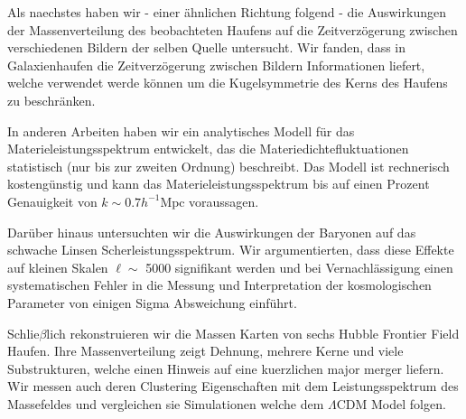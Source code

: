 Als naechstes haben wir - einer {\"a}hnlichen Richtung folgend - die
Auswirkungen der Massenverteilung des beobachteten Haufens auf die
Zeitverzögerung zwischen verschiedenen Bildern der selben Quelle untersucht.
Wir fanden, dass in Galaxienhaufen die Zeitverz{\"o}gerung zwischen Bildern
Informationen liefert, welche verwendet werde k{\"o}nnen um die Kugelsymmetrie
des Kerns des Haufens zu beschr{\"a}nken.

In anderen Arbeiten haben wir ein analytisches Modell f{\"u}r das
Materieleistungsspektrum entwickelt, das die Materiedichtefluktuationen
statistisch (nur bis zur zweiten Ordnung) beschreibt.
Das Modell ist  rechnerisch kosteng{\"u}nstig und kann das
Materieleistungsspektrum bis auf einen Prozent Genauigkeit von
$k \sim 0.7 h^{- 1} \mathrm{Mpc}$ voraussagen.

Dar{\"u}ber hinaus untersuchten wir die Auswirkungen der Baryonen auf das
schwache Linsen Scherleistungsspektrum. Wir argumentierten, dass diese Effekte
auf kleinen Skalen $\ell \sim$ 5000 signifikant werden und bei
Vernachl{\"a}ssigung einen systematischen Fehler in die Messung und
Interpretation der kosmologischen Parameter von einigen Sigma Absweichung
einf{\"u}hrt.

Schlie$\beta$lich rekonstruieren wir die Massen Karten von sechs Hubble
Frontier Field Haufen. Ihre Massenverteilung zeigt Dehnung, mehrere Kerne und
viele Substrukturen, welche einen Hinweis auf eine kuerzlichen major merger
liefern. Wir messen auch deren Clustering Eigenschaften mit dem
Leistungsspektrum des Massefeldes und vergleichen sie Simulationen welche
dem $\Lambda$CDM Model folgen.

